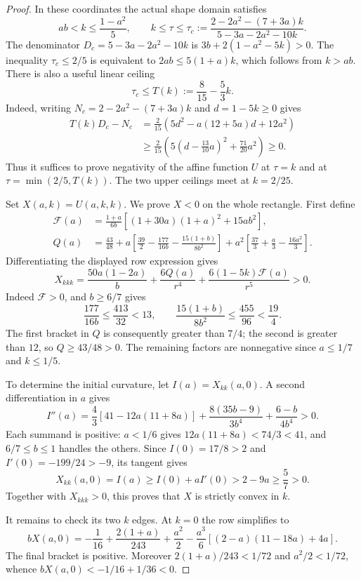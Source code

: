 \begin{proof}
In these coordinates the actual shape domain satisfies
\[
 ab<k\le\frac{1-a^2}{5},\qquad
 k\le\tau\le\tau_c:=\frac{2-2a^2-(7+3a)k}{5-3a-2a^2-10k}.
\]
The denominator $D_c=5-3a-2a^2-10k$ is
$3b+2(1-a^2-5k)>0$. The inequality $\tau_c\le2/5$ is equivalent to
$2ab\le5(1+a)k$, which follows from $k>ab$.
There is also a useful linear ceiling
\[
 \tau_c\le T(k):=\frac8{15}-\frac53k.
\]
Indeed, writing $N_c=2-2a^2-(7+3a)k$ and $d=1-5k\ge0$ gives
\begin{align*}
 T(k)D_c-N_c
 &=\frac2{15}\left(5d^2-a(12+5a)d+12a^2\right)\\
 &\ge\frac2{15}\left(5\left(d-\frac{13}{10}a\right)^2
                                      +\frac{71}{20}a^2\right)\ge0.
\end{align*}
Thus it suffices to prove negativity of the affine function $U$ at
$\tau=k$ and at $\tau=\min(2/5,T(k))$.
The two upper ceilings meet at $k=2/25$.


Set $X(a,k)=U(a,k,k)$. We prove $X<0$ on the whole rectangle.
First define
\begin{align*}
 \mathcal F(a)&=\frac{1+a}{6b}
        \left[(1+30a)(1+a)^2+15ab^2\right],\\
 Q(a)&=\frac{43}{48}
   +a\left[\frac{39}{2}-\frac{177}{16b}
                         -\frac{15(1+b)}{8b^2}\right]
   +a^2\left[\frac{37}{3}+\frac a3-\frac{16a^2}{3}\right].
\end{align*}
Differentiating the displayed row expression gives
\[
 X_{kkk}=\frac{50a(1-2a)}b
       +\frac{6Q(a)}{r^4}+\frac{6(1-5k)\mathcal F(a)}{r^5}>0.
\]
Indeed $\mathcal F>0$, and $b\ge6/7$ gives
\[
 \frac{177}{16b}\le\frac{413}{32}<13,\qquad
 \frac{15(1+b)}{8b^2}\le\frac{455}{96}<\frac{19}{4}.
\]
The first bracket in $Q$ is consequently greater than $7/4$;
the second is greater than $12$, so $Q\ge43/48>0$.
The remaining factors are nonnegative since $a\le1/7$ and $k\le1/5$.

To determine the initial curvature, let $I(a)=X_{kk}(a,0)$. A second
differentiation in $a$ gives
\[
 I''(a)=\frac43\left[41-12a(11+8a)\right]
          +\frac{8(35b-9)}{3b^4}+\frac{6-b}{4b^4}>0.
\]
Each summand is positive: $a<1/6$ gives
$12a(11+8a)<74/3<41$, and $6/7\le b\le1$ handles the others.
Since $I(0)=17/8>2$ and $I'(0)=-199/24>-9$, its tangent gives
\[
 X_{kk}(a,0)=I(a)\ge I(0)+aI'(0)>2-9a\ge\frac57>0.
\]
Together with $X_{kkk}>0$, this proves that $X$ is strictly convex in $k$.

It remains to check its two $k$ edges. At $k=0$ the row simplifies to
\[
 bX(a,0)=-\frac1{16}+\frac{2(1+a)}{243}+\frac{a^2}{2}
       -\frac{a^3}{6}\left[(2-a)(11-18a)+4a\right].
\]
The final bracket is positive. Moreover
$2(1+a)/243<1/72$ and $a^2/2<1/72$, whence
$bX(a,0)<-1/16+1/36<0$.


\end{proof}
